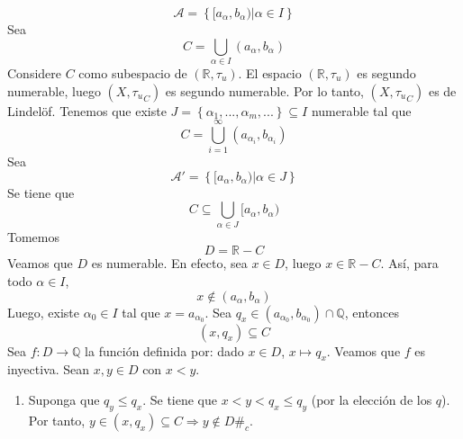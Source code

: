 \documentclass[12pt]{report}
\theoremstyle{largebreak}
\newcommand\cf[3]{\ensuremath{#1:#2\rightarrow#3}}
\newcommand\contradiction{\ensuremath{\#_c}}
\begin{document}
\begin{exa}
\begin{enumerate}
            \begin{equation*}
                \mathcal{A}=\left\{[a_\alpha,b_\alpha)\Big|\alpha\in I \right\}
            \end{equation*}
            Sea
            \begin{equation*}
                C=\bigcup_{\alpha\in I}(a_\alpha,b_\alpha)
            \end{equation*}
            Considere $C$ como subespacio de $(\mathbb{R},\tau_u)$. El espacio $(\mathbb{R},\tau_u)$ es segundo numerable, luego $(X,{\tau_u}_C)$ es segundo numerable. Por lo tanto, $(X,{\tau_u}_C)$ es de Lindelöf. Tenemos que existe $J=\left\{\alpha_1,...,\alpha_m,... \right\} \subseteq I$ numerable tal que
            \begin{equation*}
                C=\bigcup_{ i=1}^\infty (a_{\alpha_i},b_{\alpha_i})
            \end{equation*}
            Sea
            \begin{equation*}
                \mathcal{A}'=\left\{[a_\alpha,b_\alpha)\Big|\alpha\in J \right\}
            \end{equation*}
            Se tiene que
            \begin{equation*}
                C\subseteq\bigcup_{\alpha\in J}[a_\alpha,b_\alpha)
            \end{equation*}
            Tomemos
            \begin{equation*}
                D=\mathbb{R}-C
            \end{equation*}
            Veamos que $D$ es numerable. En efecto, sea $x\in D$, luego $x\in\mathbb{R}-C$. Así, para todo $\alpha\in I$,
            \begin{equation*}
                x\notin (a_\alpha,b_\alpha)
            \end{equation*}
            Luego, existe $\alpha_0\in I$ tal que $x= a_{\alpha_0}$. Sea $q_x\in(a_{\alpha_0},b_{\alpha_0})\cap\mathbb{Q}$, entonces
            \begin{equation*}
                (x,q_x)\subseteq C
            \end{equation*}
            Sea $\cf{f}{D}{\mathbb{Q}}$ la función definida por: dado $x\in D$, $x\mapsto q_x$. Veamos que $f$ es inyectiva. Sean $x,y\in D$ con $x<y$.
            \begin{enumerate}
                \item Suponga que $q_y\leq q_x$. Se tiene que $x<y<q_x\leq q_y$ (por la elección de los $q$). Por tanto, $y\in (x,q_x)\subseteq C\Rightarrow y\notin D$\contradiction.

\end{enumerate}
\end{enumerate}
\end{exa}
\end{document}
